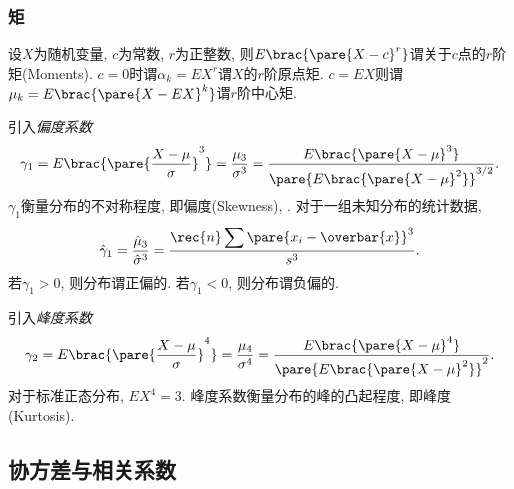 \documentclass[../Statistics.tex]{subfiles}
\begin{document}
\subsubsection{矩} %
\label{ssub:矩}

设$X$为随机变量, $c$为常数, $r$为正整数, 则$E\brac{\pare{X-c}^r}$谓关于$c$点的$r$阶矩(Moments). $c=0$时谓$\alpha_k = EX^r$谓$X$的$r$阶原点矩. $c=EX$则谓$\mu_k = E\brac{\pare{X-EX}^k}$谓$r$阶中心矩.
\par
引入\emph{偏度系数}
\[ \gamma_1 = E\brac{\pare{\frac{X-\mu}{\sigma}}^3} = \frac{\mu_3}{\sigma^3} = \frac{E\brac{\pare{X-\mu}^3}}{\pare{E\brac{\pare{X-\mu}^2}}^{3/2}}. \]
$\gamma_1$衡量分布的不对称程度, 即偏度(Skewness), . 对于一组未知分布的统计数据,
\[ \hat{\gamma}_1 = \frac{\hat{\mu}_3}{\hat{\sigma}^3} = \frac{\displaystyle \rec{n} \sum\pare{x_i - \overbar{x}}^3}{s^3}. \]
若$\gamma_1 > 0$, 则分布谓正偏的. 若$\gamma_1 < 0$, 则分布谓负偏的.
\par
引入\emph{峰度系数}
\[ \gamma_2 = E\brac{\pare{\frac{X-\mu}{\sigma}}^4} = \frac{\mu_4}{\sigma^4} = \frac{E\brac{\pare{X-\mu}^4}}{\pare{E\brac{\pare{X-\mu}^2}}^2}. \]
对于标准正态分布, $EX^4 = 3$. 峰度系数衡量分布的峰的凸起程度, 即峰度(Kurtosis).



\subsection{协方差与相关系数} %
\label{sub:协方差与相关系数}
\end{document}
